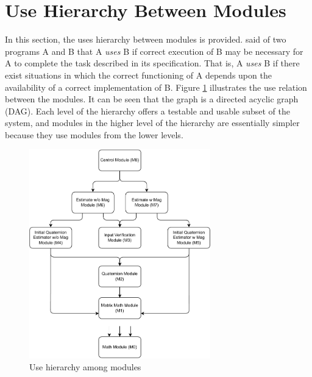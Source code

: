 \documentclass[12pt, titlepage]{article}
\begin{document}
\section{Use Hierarchy Between Modules} \label{SecUse}

In this section, the uses hierarchy between modules is provided. \citet{Parnas1978} said of two
programs A and B that A {\em uses} B if correct execution of B may be necessary for A to complete
the task described in its specification. That is, A {\em uses} B if there exist situations in which
the correct functioning of A depends upon the availability of a correct implementation of B.  Figure
\ref{FigUH} illustrates the use relation between the modules. It can be seen that the graph is a
directed acyclic graph (DAG). Each level of the hierarchy offers a testable and usable subset of the
system, and modules in the higher level of the hierarchy are essentially simpler because they use
modules from the lower levels.

\begin{figure}[H]
\centering
\includegraphics[width=0.7\textwidth]{uses_diagram.pdf}
\caption{Use hierarchy among modules}
\label{FigUH}
\end{figure}


\end{document}
